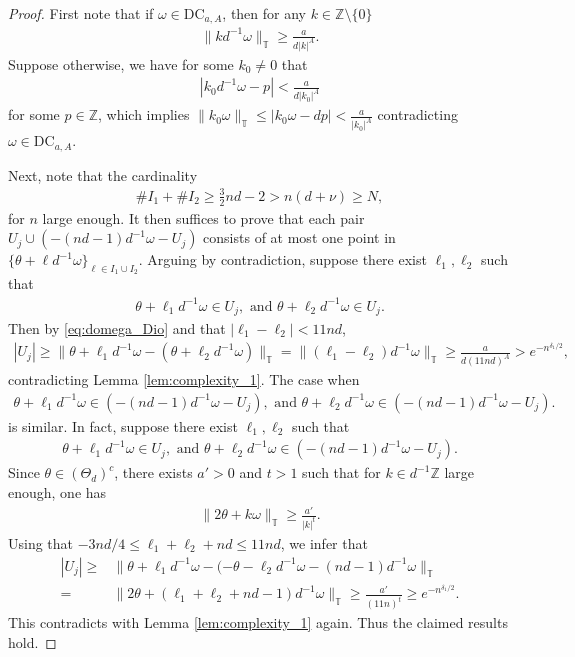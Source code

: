 \documentclass[11pt]{amsart}
\newcommand{\Z}{\mathbb Z}
\newcommand{\T}{\mathbb T}
\begin{document}
\begin{proof}
First note that if $\omega\in \mathrm{DC}_{a,A}$, then for any $k\in \Z\setminus \{0\}$ 
\begin{align}\label{eq:domega_Dio}
    \|kd^{-1}\omega\|_{\T}\geq \frac{a}{d |k|^{A}}.
\end{align}
Suppose otherwise, we have for some $k_0\neq 0$ that
\begin{align}
|k_0d^{-1}\omega-p|<\frac{a}{d|k_0|^A}
\end{align}
for some $p\in \Z$, which implies $\|k_0\omega\|_{\T}\leq |k_0\omega-dp|<\frac{a}{|k_0|^A}$ contradicting  $\omega\in \mathrm{DC}_{a,A}$.

Next, note that the cardinality
\begin{align}
\# I_1+\# I_2\geq \frac{3}{2} nd-2> n(d+\nu)\geq N,
\end{align}
for $n$ large enough.
It then suffices to prove that each pair $U_j\cup (-(nd-1)d^{-1}\omega-U_j)$ consists of at most one point in  $\{\theta+\ell d^{-1}\omega\}_{\ell\in I_1\cup I_2}$. 
Arguing by contradiction, suppose there exist $\ell_1, \ell_2$ such that
\begin{align*}
\theta+\ell_1 d^{-1}\omega\in U_j, \text{ and } \theta+\ell_2 d^{-1}\omega\in U_j.
\end{align*}
Then by \eqref{eq:domega_Dio} and that $|\ell_1-\ell_2|<11nd$, 
\begin{align*}
|U_j|\geq \|\theta+\ell_1 d^{-1}\omega-(\theta+\ell_2 d^{-1}\omega)\|_{\T}=\|(\ell_1-\ell_2)d^{-1}\omega\|_{\T}\geq \frac{a}{d(11nd)^A}>e^{-n^{\delta_1/2}},
\end{align*}
contradicting Lemma \ref{lem:complexity_1}.
The case when 
\begin{align*}
\theta+\ell_1d^{-1}\omega\in (-(nd-1)d^{-1}\omega-U_j), \text{ and } \theta+\ell_2d^{-1}\omega\in (-(nd-1)d^{-1}\omega-U_j). 
\end{align*}
is similar.
In fact, suppose there exist $\ell_1, \ell_2$ such that
\begin{align*}
\theta+\ell_1d^{-1}\omega\in U_j, \text{ and } \theta+\ell_2d^{-1}\omega\in (-(nd-1)d^{-1}\omega-U_j). 
\end{align*}
Since $\theta\in (\Theta_d)^c$, there exists $a'>0$ and $t>1$ such that for $k\in d^{-1}\Z$ large enough, one has 
\begin{align*}
\|2\theta+k\omega\|_{\T}\geq \frac{a'}{|k|^t}.
\end{align*}
Using that $-3nd/4\leq \ell_1+\ell_2+nd\leq 11nd$, we infer that 
\begin{align*}
|U_j|\geq &\|\theta+\ell_1d^{-1}\omega-(-\theta-\ell_2d^{-1}\omega-(nd-1)d^{-1}\omega\|_{\T}\\
=&\|2\theta+(\ell_1+\ell_2+nd-1)d^{-1}\omega\|_{\T}\geq \frac{a'}{(11n)^{t}}\geq e^{-n^{\delta_1/2}}.
\end{align*}
This contradicts with Lemma \ref{lem:complexity_1} again. 
Thus the claimed results hold.
\end{proof}
\end{document}
